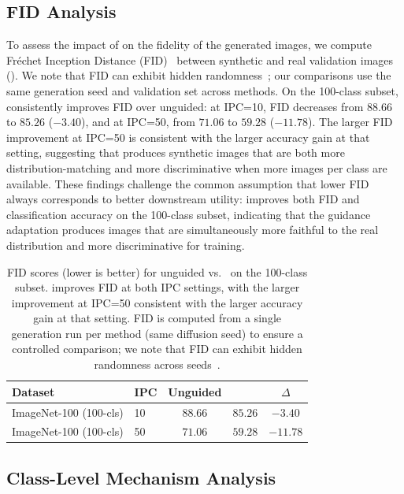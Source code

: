 \subsection{FID Analysis}
\label{sec:fid}

To assess the impact of \cags{} on the fidelity of the generated images, we compute Fr\'echet Inception Distance (FID)~\cite{heusel2017gans} between synthetic and real validation images (). We note that FID can exhibit hidden randomness~\cite{dufour2026lottery}; our comparisons use the same generation seed and validation set across methods. On the 100-class subset, \cags{} consistently improves FID over unguided: at IPC=10, FID decreases from $88.66$ to $85.26$ ($-3.40$), and at IPC=50, from $71.06$ to $59.28$ ($-11.78$). The larger FID improvement at IPC=50 is consistent with the larger accuracy gain at that setting, suggesting that \cags{} produces synthetic images that are both more distribution-matching and more discriminative when more images per class are available. These findings challenge the common assumption that lower FID always corresponds to better downstream utility: \cags{} improves both FID and classification accuracy on the 100-class subset, indicating that the guidance adaptation produces images that are simultaneously more faithful to the real distribution and more discriminative for training.

\begin{table}[t]
\centering
\caption{FID scores (lower is better) for unguided vs.\ \cags{} on the 100-class subset. \cags{} improves FID at both IPC settings, with the larger improvement at IPC=50 consistent with the larger accuracy gain at that setting. FID is computed from a single generation run per method (same diffusion seed) to ensure a controlled comparison; we note that FID can exhibit hidden randomness across seeds~\cite{dufour2026lottery}.}
\label{tab:fid}
\begin{tabular}{llccc}
\toprule
\textbf{Dataset} & \textbf{IPC} & \textbf{Unguided} & \textbf{\cags{}} & \textbf{$\Delta$} \\
\midrule
ImageNet-100 (100-cls) & 10 & $88.66$ & $\mathbf{85.26}$ & $-3.40$ \\
ImageNet-100 (100-cls) & 50 & $71.06$ & $\mathbf{59.28}$ & $-11.78$ \\
\bottomrule
\end{tabular}
\end{table}

\subsection{Class-Level Mechanism Analysis}
\label{sec:class-analysis}

